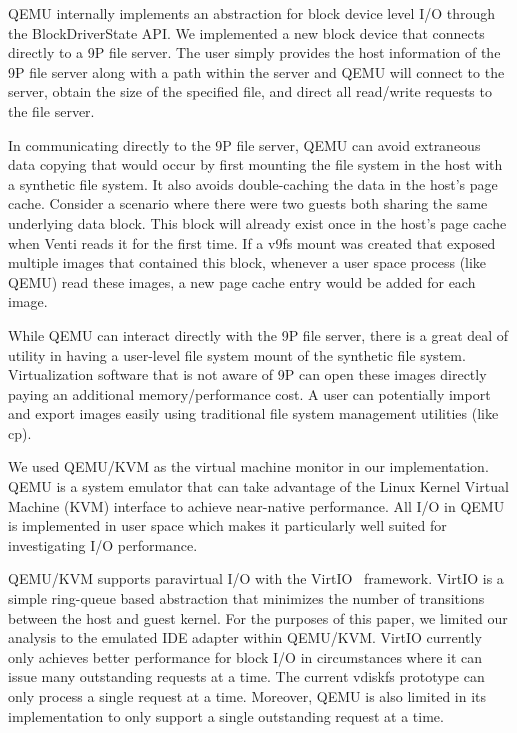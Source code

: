 QEMU internally implements an abstraction for block device level I/O through 
the BlockDriverState API.  
We implemented a new block device that connects directly to a 9P file server.  
The user simply provides the host information of the 9P
file server along with a path within the server and QEMU will connect to 
the server, obtain the size of the specified file, and direct all read/write 
requests to the file server.

In communicating directly to the 9P file server, QEMU can avoid extraneous data
copying that would occur by first mounting the file system in the host with a
synthetic file system.  It also avoids double-caching the data in the host's
page cache.  Consider a scenario where there were two guests both sharing the
same underlying data block.  This block will already exist once in the host's
page cache when Venti reads it for the first time.  If a v9fs mount was created
that exposed multiple images that contained this block, whenever a user space
process (like QEMU) read these images, a new page cache entry would be added for
each image.

While QEMU can interact directly with the 9P file server, there is a great 
deal of utility in having a user-level file system mount of the synthetic 
file system.  
Virtualization software that is not aware of 9P can open these images directly 
paying an additional memory/performance cost.  
A user can potentially import and export images easily using traditional 
file system management utilities (like cp).  

We used QEMU/KVM as the virtual machine monitor in our implementation.  
QEMU is a system emulator that can take advantage of the Linux Kernel Virtual 
Machine (KVM) interface to achieve near-native performance.  
All I/O in QEMU is implemented in user space which makes it particularly well 
suited for investigating I/O performance.

QEMU/KVM supports paravirtual I/O with the VirtIO~\cite{virtio} framework.  
VirtIO is a simple ring-queue based abstraction that minimizes the number of 
transitions between the host and guest kernel.  
For the purposes of this paper, we limited our analysis to the emulated 
IDE adapter within QEMU/KVM.  
VirtIO currently only achieves better performance for block I/O in 
circumstances where it can issue many outstanding requests at a time.  
The current vdiskfs prototype can only process a single request at a time.  
Moreover, QEMU is also limited in its implementation to only support a 
single outstanding request at a time.
